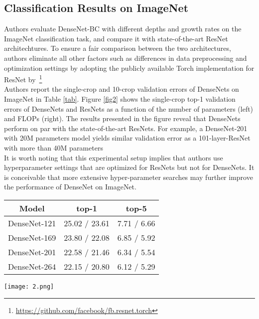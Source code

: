 \documentclass[10pt,letterpaper]{article}
\begin{document}
\begin{multicols}{2}
\section{Classification Results on ImageNet}
Authors evaluate DenseNet-BC with different depths and growth rates on the ImageNet classification task, and compare it with state-of-the-art ResNet architechtures. To ensure a fair comparison between the two architectures, authors eliminate all other factors such as differences in data preprocessing and optimization settings by adopting the publicly available Torch implementation for ResNet by~\cite{Maxout}\footnote{\url{https://github.com/facebook/fb.resnet.torch}}\\
\indent Authors report the single-crop and 10-crop validation errors of DenseNets on ImageNet in Table \ref{tab}. Figure \ref{fig2} shows the single-crop top-1 validation errors of DenseNets and ResNets as a function of the number of parameters (left) and FLOPs (right). The results presented in the figure reveal that DenseNets perform on par with the state-of-the-art ResNets. For example, a DenseNet-201 with 20M parameters model yields similar validation error as a 101-layer-ResNet with more than 40M parameters\\
\indent It is worth noting that this experimental setup implies that authors use hyperparameter settings that are optimized for ResNets but not for DenseNets. It is conceivable that more extensive hyper-parameter searches may further improve the performance of DenseNet on ImageNet.\\
\end{multicols}

\makeatletter{}\makeatother 
\begin{minipage}{.35\linewidth}
\centering
\renewcommand{\arraystretch}{1.6}
\begin{tabular}{c|c|c}
  \hline
  Model & top-1 & top-5 \\ \hline
  DenseNet-121 & 25.02 / 23.61 & 7.71 / 6.66 \\ 
  DenseNet-169 & 23.80 / 22.08 & 6.85 / 5.92 \\ 
  
  DenseNet-201 & 22.58 / 21.46 & 6.34 / 5.54 \\ 
  
  DenseNet-264 & 22.15 / 20.80 & 6.12 / 5.29  \\ \hline
\end{tabular}
\caption{The top-1 and top-5 error rates on the ImageNet validation set, with single-crop / 10-crop testing.}
\label{tab}
\end{minipage}
\makeatletter{}\makeatother 
\begin{minipage}{.65\linewidth}
\centering
\texttt{[image: 2.png]}
\caption{ Comparison of the DenseNets and ResNets top-1 error rates (single-crop testing) on the ImageNet validation dataset as a function of learned parameters (left) and FLOPs during test-time (right).}
\label{fig2}
\end{minipage}
\end{document}
